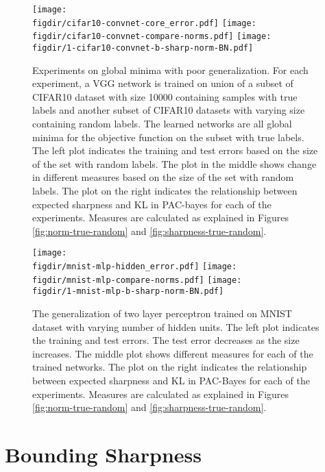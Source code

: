 \documentclass{article}
\newcommand{\figdir}{.}
\begin{document}
\begin{figure}[t]
\centering
\texttt{[image: \\figdir/cifar10-convnet-core\_error.pdf]}
\texttt{[image: \\figdir/cifar10-convnet-compare-norms.pdf]}
\texttt{[image: \\figdir/1-cifar10-convnet-b-sharp-norm-BN.pdf]}
\caption{\small Experiments on global minima with poor generalization. For each experiment, a VGG network is trained on union of a subset of CIFAR10 dataset with size 10000 containing samples with true labels and another subset of CIFAR10 datasets with varying size containing random labels. The learned networks are all global minima for the objective function on the subset with true labels. The left plot indicates the training and test errors based on the size of the set with random labels. The plot in the middle shows change in different measures based on the size of the set with random labels. The plot on the right indicates the relationship between expected sharpness and KL in PAC-bayes for each of the experiments. Measures are calculated as explained in Figures \ref{fig:norm-true-random} and \ref{fig:sharpness-true-random}.}
\label{fig:cifar-core}
\end{figure}

\begin{figure}[t]
\centering
\texttt{[image: \\figdir/mnist-mlp-hidden\_error.pdf]}
\texttt{[image: \\figdir/mnist-mlp-compare-norms.pdf]}
\texttt{[image: \\figdir/1-mnist-mlp-b-sharp-norm-BN.pdf]}
\caption{\small The generalization of two layer perceptron trained on MNIST dataset with varying number of hidden units. The left plot indicates the training and test errors. The test error decreases as the size increases. The middle plot shows different measures for each of the trained networks. The plot on the right indicates the relationship between expected sharpness and KL in PAC-Bayes for each of the experiments. Measures are calculated as explained in Figures \ref{fig:norm-true-random} and \ref{fig:sharpness-true-random}.}
\label{fig:hidden}
\end{figure}



\section{Bounding Sharpness}\label{sec:pac_bayes}
\end{document}
